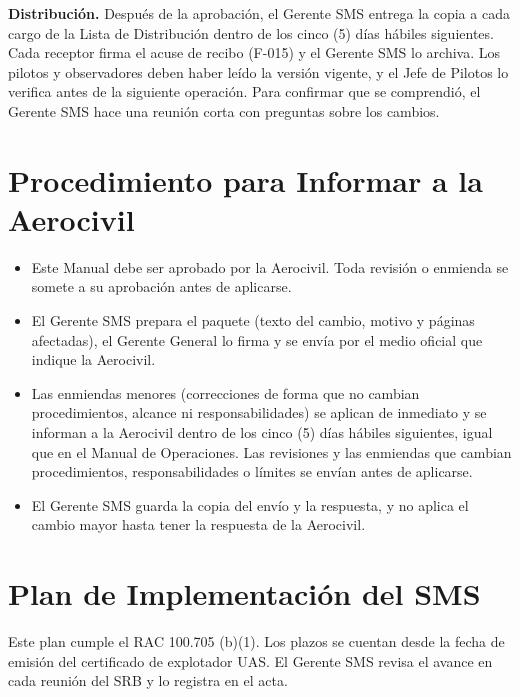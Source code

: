 \textbf{Distribución.} Después de la aprobación, el Gerente SMS entrega la copia a cada cargo de la Lista de Distribución dentro de los cinco (5) días hábiles siguientes. Cada receptor firma el acuse de recibo (F-015) y el Gerente SMS lo archiva. Los pilotos y observadores deben haber leído la versión vigente, y el Jefe de Pilotos lo verifica antes de la siguiente operación. Para confirmar que se comprendió, el Gerente SMS hace una reunión corta con preguntas sobre los cambios.

\section{Procedimiento para Informar a la Aerocivil}
\begin{itemize}
    \item Este Manual debe ser aprobado por la Aerocivil. Toda revisión o enmienda se somete a su aprobación antes de aplicarse.
    \item El Gerente SMS prepara el paquete (texto del cambio, motivo y páginas afectadas), el Gerente General lo firma y se envía por el medio oficial que indique la Aerocivil.
    \item Las enmiendas menores (correcciones de forma que no cambian procedimientos, alcance ni responsabilidades) se aplican de inmediato y se informan a la Aerocivil dentro de los cinco (5) días hábiles siguientes, igual que en el Manual de Operaciones. Las revisiones y las enmiendas que cambian procedimientos, responsabilidades o límites se envían antes de aplicarse.
    \item El Gerente SMS guarda la copia del envío y la respuesta, y no aplica el cambio mayor hasta tener la respuesta de la Aerocivil.
\end{itemize}

\section{Plan de Implementación del SMS}
Este plan cumple el RAC 100.705 (b)(1). Los plazos se cuentan desde la fecha de emisión del certificado de explotador UAS. El Gerente SMS revisa el avance en cada reunión del SRB y lo registra en el acta.

